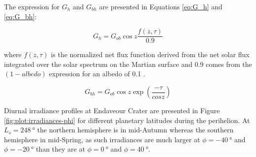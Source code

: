 The expression for $G_{h}$ and $G_{bh}$ are presented in Equations \ref{eq:G_h} and \ref{eq:G_bh}:

\begin{equation}
  \label{eq:G_h_2}
  G_{h} = G_{ob}\cos{z}\frac{f(z,\tau)}{0.9}
\end{equation}

where $f(z,\tau)$ is the normalized net flux function derived from the net solar flux integrated over the solar spectrum on the Martian surface and 0.9 comes from the $(1-albedo)$ expression for an albedo of 0.1 .

\begin{equation}
  \label{eq:G_bh}
  G_{bh} = G_{ob}\cos{z}\exp(\frac{-\tau}{cos{z}})
\end{equation}

Diurnal irradiance profiles at Endaveour Crater are presented in Figure \ref{fig:plot:irradiances-phi} for different planetary latitudes during the perihelion. At $L_{s} = \SI{248}{\degree}$ the northern hemisphere is in mid-Autumn whereas the southern hemisphere in mid-Spring, as such irradiances are much larger at $\phi = \SI{-40}{\degree}$ and $\phi = \SI{-20}{\degree}$ than they are at $\phi = \SI{0}{\degree}$ and $\phi = \SI{40}{\degree}$.

